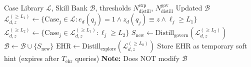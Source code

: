 \begin{algorithm}[t]
\caption{Dual-Track Distillation}
\label{alg:distillation}
\begin{algorithmic}[1]
\REQUIRE Case Library $\mathcal{L}$, Skill Bank $\mathcal{B}$, thresholds $N_{\text{distill}}^{\text{exp}}$, $N_{\text{distill}}^{\text{gov}}$
\ENSURE Updated $\mathcal{B}$
  \STATE $\mathcal{L}_{d,z}^{(\geq L_1)} \leftarrow \{\text{Case}_j \in \mathcal{L} : e_d(q_j){=}1 \wedge z_d(q_j) \equiv z \wedge \ell_j \geq L_1\}$
  \STATE $\mathcal{L}_{d,z}^{(\geq L_2)} \leftarrow \{\text{Case}_j \in \mathcal{L}_{d,z}^{(\geq L_1)} : \ell_j \geq L_2\}$
    \STATE $S_{\text{new}} \leftarrow \text{Distill}_{\text{govern}}(\mathcal{L}_{d,z}^{(\geq L_2)})$ 
      \STATE $\mathcal{B} \leftarrow \mathcal{B} \cup \{S_{\text{new}}\}$ 
    \ENDIF
    \STATE $\text{EHR} \leftarrow \text{Distill}_{\text{explore}}(\mathcal{L}_{d,z}^{(\geq L_0)})$ 
    \STATE Store EHR as temporary soft hint (expires after $T_{\text{ehr}}$ queries)
    \STATE \textbf{Note:} Does NOT modify $\mathcal{B}$
  \ENDIF
\ENDFOR
\end{algorithmic}
\end{algorithm}
